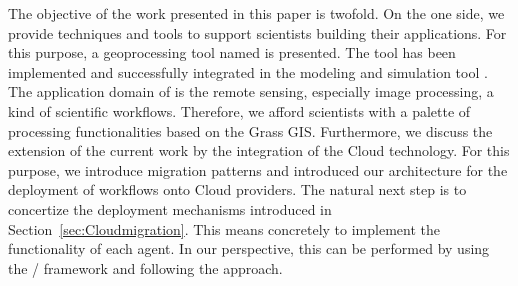 \label{sec:conclusion}
%
The objective of the work presented in this paper is twofold.
%
On the one side, we provide techniques and tools to support scientists building their applications.
%
For this purpose, a geoprocessing tool named \RenewGrass{} is presented.
%
The tool has been implemented and successfully integrated in the modeling and simulation tool \Renew{}.
%
%
The application domain of \RenewGrass{} is the remote sensing, especially image processing, a kind of scientific workflows. 
%
Therefore, we afford scientists with a palette of processing functionalities based on the Grass GIS. 
%
Furthermore, we discuss the extension of the current work by the integration of the Cloud technology. 
%
For this purpose, we introduce migration patterns and introduced our architecture for the deployment of workflows onto Cloud providers. 
%
The natural next step is to concertize the deployment mechanisms introduced in Section~\ref{sec:Cloudmigration}.
%
This means concretely to implement the functionality of each agent.
%
In our perspective, this can be performed by using the \Mulan{}/\Capa{} framework and following the \Paose{} approach.
